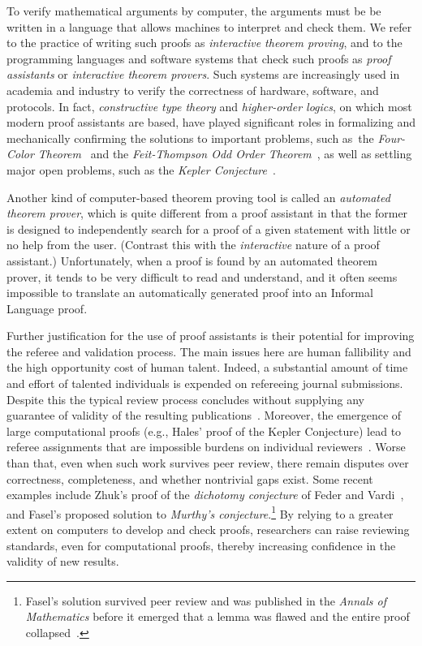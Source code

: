 \documentclass[11pt]{amsart}  %
\begin{document}
To verify mathematical arguments by computer, the arguments must be be written in a language that allows machines to interpret and check them. We refer to the practice of writing such proofs as \emph{interactive theorem proving}, and to the programming languages and software systems that check such proofs as \emph{proof assistants} or \emph{interactive theorem provers}.  Such systems are increasingly used in academia and industry to verify the correctness of hardware, software, and protocols. In fact, \emph{constructive type theory} and \emph{higher-order logics}, on which most modern proof assistants are based, have played significant roles in formalizing and mechanically confirming the solutions to important problems, such as~the \emph{Four-Color Theorem}~\cite{MR2463991} 
and the \emph{Feit-Thompson Odd Order Theorem}~\cite{gonthier:2013b}, as well as settling major open problems, such as the \emph{Kepler Conjecture}~\cite{MR3659768}.

Another kind of computer-based theorem proving tool is called an \emph{automated theorem prover}, which is quite different from a proof assistant in that the former is designed to independently search for a proof of a given statement with little or no help from the user. (Contrast this with the \emph{interactive} nature of a proof assistant.) Unfortunately, when a proof is found by an automated theorem prover, it tends to be very difficult to read and understand, and it often seems impossible to translate an automatically generated proof into an Informal Language proof.

Further justification for the use of proof assistants is their potential for improving the referee and validation process.  The main issues here are human fallibility and the high opportunity cost of human talent. Indeed, a substantial amount of time and effort of talented individuals is expended on refereeing journal submissions. Despite this the typical review process concludes without supplying any guarantee of validity of the resulting publications~\cite{fasel:2017}.
Moreover, the emergence of large computational proofs (e.g., Hales' proof of the Kepler Conjecture) lead to referee assignments that are impossible burdens on individual reviewers~\cite{heule:2017}. Worse than that, even when such work survives peer review, there remain disputes over correctness, completeness, and whether nontrivial gaps exist. Some recent examples include %
Zhuk's proof of the \emph{\csp dichotomy conjecture} of Feder and 
Vardi~\cite{zhuk:2017}, and Fasel's proposed solution to 
  \emph{Murthy's conjecture}.\footnote{Fasel's solution survived peer review 
  and was published in the \emph{Annals of Mathematics} before it emerged that a lemma was flawed and the entire proof collapsed~\cite{fasel:2017}.} 
By relying to a greater extent on computers to develop and check proofs, researchers can raise reviewing standards, even for computational proofs, thereby increasing confidence in the validity of new results. 
\end{document}
